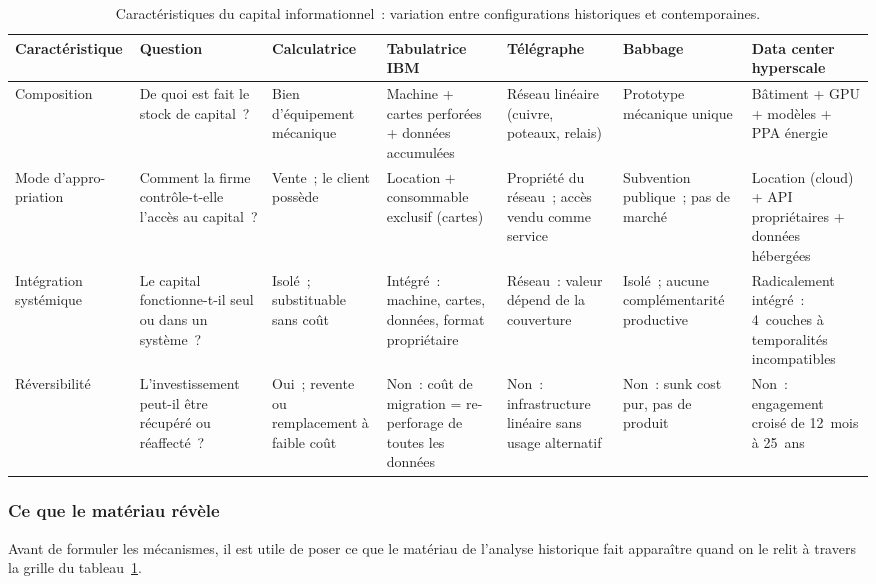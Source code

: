 \begin{table}[!ht]
\caption{Caractéristiques du capital informationnel~: variation entre configurations historiques et contemporaines.}\label{tab:d2-capital}
\centering\footnotesize
\renewcommand{\arraystretch}{1.35}
\begin{tabularx}{\textwidth}{@{}p{1.8cm}p{3.8cm}p{2.0cm}p{2.0cm}p{2.0cm}p{2.0cm}X@{}}
\toprule
\textbf{Caractéristique} & \textbf{Question} & \textbf{Calculatrice} & \textbf{Tabulatrice IBM} & \textbf{Télégraphe} & \textbf{Babbage} & \textbf{Data center hyperscale} \\
\midrule
Composition & De quoi est fait le stock de capital~? & Bien d'équipement mécanique & Machine + cartes perforées + données accumulées & Réseau linéaire (cuivre, poteaux, relais) & Prototype mécanique unique & Bâtiment + GPU + modèles + PPA énergie \\
Mode d'appro- priation & Comment la firme contrôle-t-elle l'accès au capital~? & Vente~; le client possède & Location + consommable exclusif (cartes) & Propriété du réseau~; accès vendu comme service & Subvention publique~; pas de marché & Location (cloud) + API propriétaires + données hébergées \\
Intégration systémique & Le capital fonctionne-t-il seul ou dans un système~? & Isolé~; substituable sans coût & Intégré~: machine, cartes, données, format propriétaire & Réseau~: valeur dépend de la couverture & Isolé~; aucune complémentarité productive & Radicalement intégré~: 4~couches à temporalités incompatibles \\
Réversibilité & L'investissement peut-il être récupéré ou réaffecté~? & Oui~; revente ou remplacement à faible coût & Non~: coût de migration = re-perforage de toutes les données & Non~: infrastructure linéaire sans usage alternatif & Non~: sunk cost pur, pas de produit & Non~: engagement croisé de 12~mois à 25~ans \\
\bottomrule
\end{tabularx}
\renewcommand{\arraystretch}{1.0}
\end{table}


\subsubsection{Ce que le matériau révèle}

Avant de formuler les mécanismes, il est utile de poser ce que le matériau de l'analyse historique fait apparaître quand on le relit à travers la grille du tableau~\ref{tab:d2-capital}.

